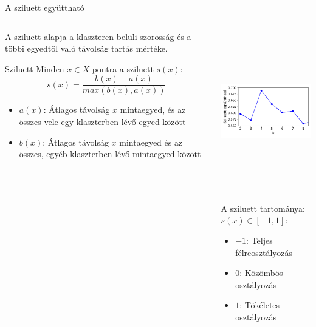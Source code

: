 \documentclass[english, aspectratio=169]{beamer}
\begin{document}
\begin{frame}{A sziluett együttható}
\begin{columns}
\begin{column}{.5\textwidth}
A sziluett alapja a klaszteren belüli szorosság és a többi egyedtől való távolság tartás mértéke.\par\smallskip
\begin{block}{Sziluett}
Minden $x \in X$ pontra a sziluett $s\left( x \right)$:
\vspace{-.2cm}
\[
s\left( x \right) = \frac{b\left( x \right) - a\left( x \right)}{max\left( b\left( x \right), a\left( x \right) \right)}
\]
\vspace{-.4cm}
\begin{itemize}
	\item $a\left( x \right)$: Átlagos távolság $x$ mintaegyed, és az összes vele egy klaszterben lévő egyed között
	\item $b\left( x \right)$: Átlagos távolság $x$ mintaegyed és az összes, egyéb klaszterben lévő mintaegyed között
\end{itemize}
\end{block}
\end{column}
\begin{column}{.5\textwidth}
\begin{center}
\includegraphics[width=7cm, height=7cm, keepaspectratio]{images/unsupervised_31.png}
\end{center}
A sziluett tartománya: $s\left( x \right) \in \left[ -1, 1 \right]$:
\begin{itemize}
	\item $-1$: Teljes félreosztályozás
	\item $0$: Közömbös osztályozás
	\item $1$: Tökéletes osztályozás
\end{itemize}
\end{column}
\end{columns}
\end{frame}
\end{document}
